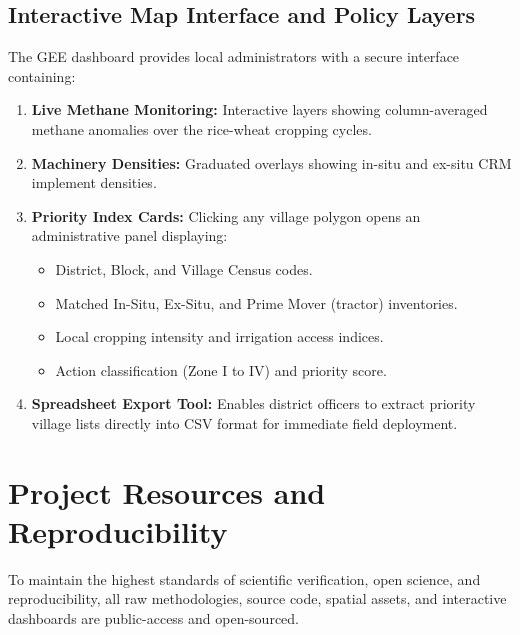 \documentclass[12pt,a4paper]{report}
\begin{document}
\section*{Interactive Map Interface and Policy Layers}
The GEE dashboard provides local administrators with a secure interface containing:
\begin{enumerate}
    \item \textbf{Live Methane Monitoring:} Interactive layers showing column-averaged methane anomalies over the rice-wheat cropping cycles.
    \item \textbf{Machinery Densities:} Graduated overlays showing in-situ and ex-situ CRM implement densities.
    \item \textbf{Priority Index Cards:} Clicking any village polygon opens an administrative panel displaying:
        \begin{itemize}
            \item District, Block, and Village Census codes.
            \item Matched In-Situ, Ex-Situ, and Prime Mover (tractor) inventories.
            \item Local cropping intensity and irrigation access indices.
            \item Action classification (Zone I to IV) and priority score.
        \end{itemize}
    \item \textbf{Spreadsheet Export Tool:} Enables district officers to extract priority village lists directly into CSV format for immediate field deployment.
\end{enumerate}

\chapter*{Project Resources and Reproducibility}
To maintain the highest standards of scientific verification, open science, and reproducibility, all raw methodologies, source code, spatial assets, and interactive dashboards are public-access and open-sourced.

\vspace{0.6cm}
\end{document}
